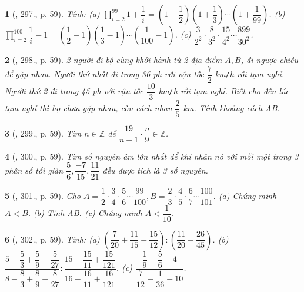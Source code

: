 \documentclass{article}
\newtheorem{baitoan}{}
\begin{document}
\begin{baitoan}[\cite{Tuyen_Toan_6}, 297., p. 59]
	Tính: (a) $\prod_{i=2}^{99} 1 + \dfrac{1}{i} = \left(1 + \dfrac{1}{2}\right)\left(1 + \dfrac{1}{3}\right)\cdots\left(1 + \dfrac{1}{99}\right)$. (b) $\prod_{i=2}^{100} \dfrac{1}{i} - 1 = \left(\dfrac{1}{2} - 1\right)\left(\dfrac{1}{3} - 1\right)\cdots\left(\dfrac{1}{100} - 1\right)$. (c) $\dfrac{3}{2^2}\cdot\dfrac{8}{3^2}\cdot\dfrac{15}{4^2}\cdots\dfrac{899}{30^2}$.
\end{baitoan}

\begin{baitoan}[\cite{Tuyen_Toan_6}, 298., p. 59]
	2 người đi bộ cùng khởi hành từ 2 địa điểm $A,B$, đi ngược chiều để gặp nhau. Người thứ nhất đi trong {\rm36 ph} với vận tốc $\dfrac{7}{2}$ {\rm km{\tt/}h} rồi tạm nghỉ. Người thứ 2 đi trong {\rm45 ph} với vận tốc $\dfrac{10}{3}$ {\rm km{\tt/}h} rồi tạm nghỉ. Biết cho đến lúc tạm nghỉ thì họ chưa gặp nhau, còn cách nhau $\dfrac{2}{5}$ {\rm km}. Tính khoảng cách AB.
\end{baitoan}

\begin{baitoan}[\cite{Tuyen_Toan_6}, 299., p. 59]
	Tìm $n\in\mathbb{Z}$ để $\dfrac{19}{n - 1}\cdot\dfrac{n}{9}\in\mathbb{Z}$.
\end{baitoan}

\begin{baitoan}[\cite{Tuyen_Toan_6}, 300., p. 59]
	Tìm số nguyên âm lớn nhất để khi nhân nó với mỗi một trong 3 phân số tối giản $\dfrac{5}{6},\dfrac{-7}{15},\dfrac{11}{21}$ đều được tích là 3 số nguyên.
\end{baitoan}

\begin{baitoan}[\cite{Tuyen_Toan_6}, 301., p. 59]
	Cho $A = \dfrac{1}{2}\cdot\dfrac{3}{4}\cdot\dfrac{5}{6}\cdots\dfrac{99}{100},B = \dfrac{2}{3}\cdot\dfrac{4}{5}\cdot\dfrac{6}{7}\cdots\dfrac{100}{101}$. (a) Chứng minh $A < B$. (b) Tính AB. (c) Chứng minh $A < \dfrac{1}{10}$.
\end{baitoan}

\begin{baitoan}[\cite{Tuyen_Toan_6}, 302., p. 59]
	Tính: (a) $\left(\dfrac{7}{20} + \dfrac{11}{15} - \dfrac{15}{12}\right):\left(\dfrac{11}{20} - \dfrac{26}{45}\right)$. (b) $\dfrac{5 - \dfrac{5}{3} + \dfrac{5}{9} - \dfrac{5}{27}}{8 - \dfrac{8}{3} + \dfrac{8}{9} - \dfrac{8}{27}}:\dfrac{15 - \dfrac{15}{11} + \dfrac{15}{121}}{16 - \dfrac{16}{11} + \dfrac{16}{121}}$. (c) $\dfrac{\dfrac{1}{9} - \dfrac{5}{6} - 4}{\dfrac{7}{12} - \dfrac{1}{36} - 10}$.
\end{baitoan}
\end{document}
